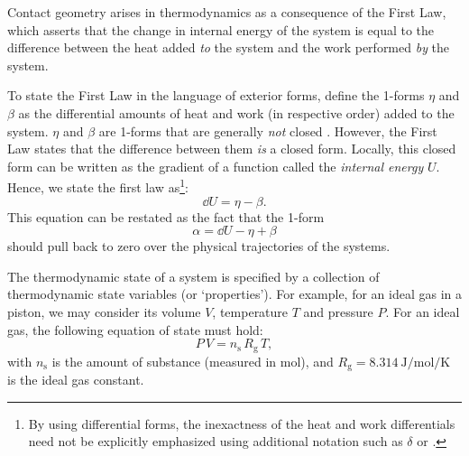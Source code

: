 Contact geometry arises in thermodynamics as a consequence of the First Law, which asserts that the change in internal energy of the system is equal to the difference between the heat added \emph{to} the system and the work performed \emph{by} the system. 

To state the First Law in the language of exterior forms, define the 1-forms $\eta$ and $\beta$ as the differential amounts of heat and work (in respective order) added to the system. $\eta$ and $\beta$ are 1-forms that are generally \emph{not} closed \cite{Bamberg1988,Frankel2012}. However, the First Law states that the difference between them \emph{is} a closed form. Locally, this closed form  can be written as the gradient of a function called the \emph{internal energy} $U$. Hence, we state the first law as\footnote{By using differential forms, the inexactness of the heat and work differentials need not be explicitly emphasized using additional notation such as $\delta$ or \dj.}:
\begin{equation}
    \dd{U} = \eta - \beta.
    \label{eq:thermo_first_law}
\end{equation}
This equation can be restated as the fact that the 1-form
$$ \alpha = \dd{U} - \eta + \beta $$
should pull back to zero over the physical trajectories of the systems.

The thermodynamic state of a system is specified by a collection of thermodynamic state variables (or `properties'). For example, for an ideal gas in a piston, we may consider its volume $V$, temperature $T$ and pressure $P$. For an ideal gas, the following equation of state must hold:
\begin{equation}
    P \, V = n_\text{s} \, R_\text{g} \, T,
    \label{eq:ideal_gas_pv}
\end{equation}
with $n_\text{s}$ is the amount of substance (measured in \si{\mole}), and $R_\text{g} = \SI{8.314}{\joule \per \mole \per \kelvin}$ is the ideal gas constant.  

